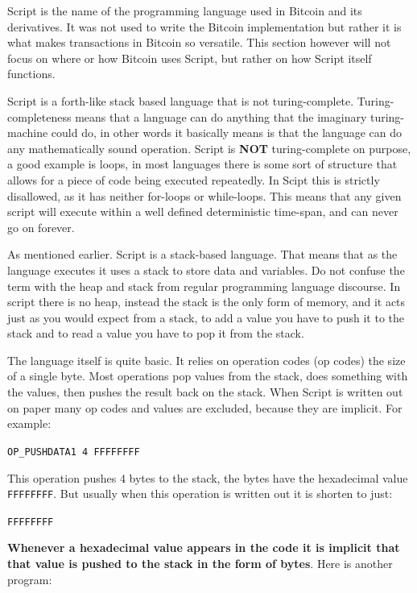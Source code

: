 
Script is the name of the programming language used in Bitcoin and its derivatives. It was not used to write the Bitcoin implementation but rather it is what makes transactions in Bitcoin so versatile. This section however will not focus on where or how Bitcoin uses Script, but rather on how Script itself functions.

Script is a forth-like stack based language that is not turing-complete.\cite{script_wiki}\cite{antonopoulos_2017} Turing-completeness means that a language can do anything that the imaginary turing-machine could do, in other words it basically means is that the language can do any mathematically sound operation. Script is \textbf{NOT} turing-complete on purpose, a good example is loops, in most languages there is some sort of structure that allows for a piece of code being executed repeatedly. In Scipt this is strictly disallowed, as it has neither for-loops or while-loops. This means that any given script will execute within a well defined deterministic time-span, and can never go on forever.

As mentioned earlier. Script is a stack-based language. That means that as the language executes it uses a stack to store data and variables. Do not confuse the term with the heap and stack from regular programming language discourse. In script there is no heap, instead the stack is the only form of memory, and it acts just as you would expect from a stack, to add a value you have to push it to the stack and to read a value you have to pop it from the stack.\cite{script_wiki}\cite{antonopoulos_2017}

The language itself is quite basic. It relies on operation codes (op codes) the size of a single byte. Most operations pop values from the stack, does something with the values, then pushes the result back on the stack. When Script is written out on paper many op codes and values are excluded, because they are implicit. For example: 

\texttt{OP\_PUSHDATA1 4 FFFFFFFF} 

This operation pushes 4 bytes to the stack, the bytes have the hexadecimal value \texttt{FFFFFFFF}. But usually when this operation is written out it is shorten to just:

\texttt{FFFFFFFF} 

\textbf{Whenever a hexadecimal value appears in the code it is implicit that that value is pushed to the stack in the form of bytes}. Here is another program:

